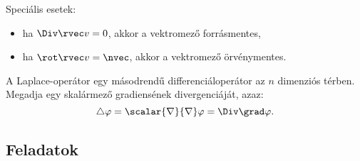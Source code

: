\documentclass[a4paper, 12pt]{scrartcl}
\begin{document}
\begin{note}
  Speciális esetek:
  \begin{itemize}
    \item ha $\Div \rvec v = 0$, akkor a vektromező forrásmentes,
    \item ha $\rot \rvec v = \nvec$, akkor a vektromező örvénymentes.
  \end{itemize}
\end{note}

\begin{definition}
  A Laplace-operátor egy másodrendű differenciáloperátor az $n$ dimenziós
  térben. Megadja egy skalármező gradiensének divergenciáját, azaz:
  \[
    \triangle \varphi
    =
    \scalar{\nabla}{\nabla} \varphi
    =
    \Div \grad \varphi
    \text.
  \]
\end{definition}

\clearpage
\subsection{Feladatok}
\end{document}
